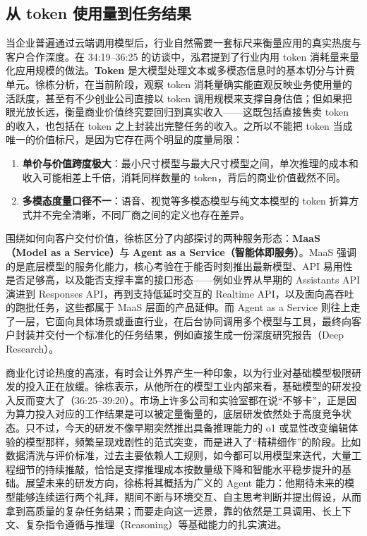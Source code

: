 \documentclass[UTF8,a4paper,11pt,fontset=fandol]{ctexart}
\begin{document}
\subsection{从 token 使用量到任务结果}
当企业普遍通过云端调用模型后，行业自然需要一套标尺来衡量应用的真实热度与客户合作深度。在 34:19–36:25 的访谈中，泓君提到了行业内用 token 消耗量来量化应用规模的做法。\textbf{Token} 是大模型处理文本或多模态信息时的基本切分与计费单元。徐栋分析，在当前阶段，观察 token 消耗量确实能直观反映业务使用量的活跃度，甚至有不少创业公司直接以 token 调用规模来支撑自身估值；但如果把眼光放长远，衡量商业价值终究要回归到真实收入——这既包括直接售卖 token 的收入，也包括在 token 之上封装出完整任务的收入。之所以不能把 token 当成唯一的价值标尺，是因为它存在两个明显的度量局限：

\begin{enumerate}
\item \textbf{单价与价值跨度极大}：最小尺寸模型与最大尺寸模型之间，单次推理的成本和收入可能相差上千倍，消耗同样数量的 token，背后的商业价值截然不同。
\item \textbf{多模态度量口径不一}：语音、视觉等多模态模型与纯文本模型的 token 折算方式并不完全清晰，不同厂商之间的定义也存在差异。
\end{enumerate}

围绕如何向客户交付价值，徐栋区分了内部探讨的两种服务形态：\textbf{MaaS（Model as a Service）}与 \textbf{Agent as a Service（智能体即服务）}。MaaS 强调的是底层模型的服务化能力，核心考验在于能否时刻推出最新模型、API 易用性是否足够高，以及能否支撑丰富的接口形态——例如业界从早期的 Assistants API 演进到 Responses API，再到支持低延时交互的 Realtime API，以及面向高吞吐的跑批任务，这些都属于 MaaS 层面的产品延伸。而 Agent as a Service 则往上走了一层，它面向具体场景或垂直行业，在后台协同调用多个模型与工具，最终向客户封装并交付一个标准化的任务结果，例如直接生成一份深度研究报告（Deep Research）。

商业化讨论热度的高涨，有时会让外界产生一种印象，以为行业对基础模型极限研发的投入正在放缓。徐栋表示，从他所在的模型工业内部来看，基础模型的研发投入反而变大了（36:25–39:20）。市场上许多公司和实验室都在说“不够卡”，正是因为算力投入对应的工作结果是可以被定量衡量的，底层研发依然处于高度竞争状态。只不过，今天的研发不像早期突然推出具备推理能力的 o1 或显性改变编辑体验的模型那样，频繁呈现戏剧性的范式突变，而是进入了“精耕细作”的阶段。比如数据清洗与评价标准，过去主要依赖人工规则，如今都可以用模型来迭代，大量工程细节的持续推敲，恰恰是支撑推理成本按数量级下降和智能水平稳步提升的基础。展望未来的研发方向，徐栋将其概括为广义的 Agent 能力：他期待未来的模型能够连续运行两个礼拜，期间不断与环境交互、自主思考判断并提出假设，从而拿到高质量的复杂任务结果；而要走向这一远景，靠的依然是工具调用、长上下文、复杂指令遵循与推理（Reasoning）等基础能力的扎实演进。
\end{document}
